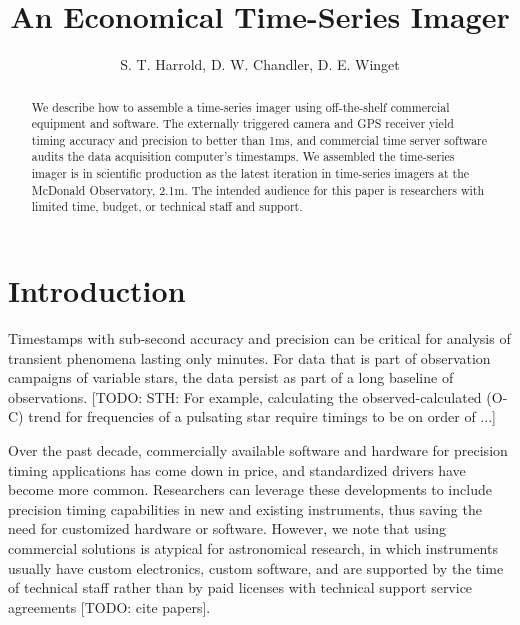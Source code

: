 \documentclass[preprint2]{aastex}
\begin{document}
\title{An Economical Time-Series Imager}

\author{
    S. T. Harrold,
    D. W. Chandler,
    D. E. Winget}


\begin{abstract}

We describe how to assemble a time-series imager using off-the-shelf commercial equipment and software. The externally triggered camera and GPS receiver yield timing accuracy and precision to better than 1ms, and commercial time server software audits the data acquisition computer's timestamps. We assembled the time-series imager is in scientific production as the latest iteration in time-series imagers at the McDonald Observatory, 2.1m. The intended audience for this paper is researchers with limited time, budget, or technical staff and support.

\end{abstract}



\section{Introduction}


Timestamps with sub-second accuracy and precision can be critical for analysis of transient phenomena lasting only minutes. For data that is part of observation campaigns of variable stars, the data persist as part of a long baseline of observations. [TODO: STH: For example, calculating the observed-calculated (O-C) trend for frequencies of a pulsating star require timings to be on order of ...]

Over the past decade, commercially available software and hardware for precision timing applications has come down in price, and standardized drivers have become more common. Researchers can leverage these developments to include precision timing capabilities in new and existing instruments, thus saving the need for customized hardware or software. However, we note that using commercial solutions is atypical for astronomical research, in which instruments usually have custom electronics, custom software, and are supported by the time of technical staff rather than by paid licenses with technical support service agreements [TODO: cite papers].
\end{document}
